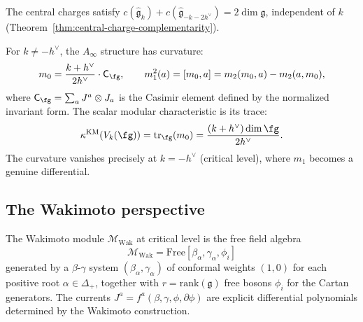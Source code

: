 \begin{remark}\label{rem:km-central-charge-sum}
The central charges satisfy $c(\widehat{\mathfrak{g}}_k) + c(\widehat{\mathfrak{g}}_{-k-2h^\vee}) = 2\dim\mathfrak{g}$, independent of $k$ (Theorem~\ref{thm:central-charge-complementarity}).
\end{remark}

\begin{definition}\label{def:curved-koszul-km}
For $k \neq -h^\vee$, the $A_\infty$ structure has curvature:
\begin{equation}
m_0 =
\frac{k+h^\vee}{2h^\vee}\cdot \mathsf C_{\fg},
\qquad
m_1^2(a) = [m_0, a] = m_2(m_0, a) - m_2(a, m_0),
\end{equation}
where $\mathsf C_{\fg} = \sum_a J^a \otimes J_a$ is the Casimir
element defined by the normalized invariant form.  The scalar
modular characteristic is its trace:
\[
\kappa^{\mathrm{KM}}(V_k(\fg))
=\operatorname{tr}_{\fg}(m_0)
=\frac{(k+h^\vee)\dim\fg}{2h^\vee}.
\]
The curvature vanishes precisely at $k = -h^\vee$ (critical level),
where $m_1$ becomes a genuine differential.
\end{definition}

\subsection{The Wakimoto perspective}

\begin{definition}\label{def:wakimoto}
The Wakimoto module $\mathcal{M}_{\mathrm{Wak}}$ at critical level is the free field algebra
\begin{equation}
\mathcal{M}_{\mathrm{Wak}} = \mathrm{Free}[\beta_\alpha, \gamma_\alpha, \phi_i]
\end{equation}
generated by a $\beta$-$\gamma$ system $(\beta_\alpha, \gamma_\alpha)$ of conformal weights $(1, 0)$ for each positive root $\alpha \in \Delta_+$, together with $r = \mathrm{rank}(\mathfrak{g})$ free bosons $\phi_i$ for the Cartan generators. The currents $J^a = f^a(\beta, \gamma, \phi, \partial\phi)$ are explicit differential polynomials determined by the Wakimoto construction.
\end{definition}


